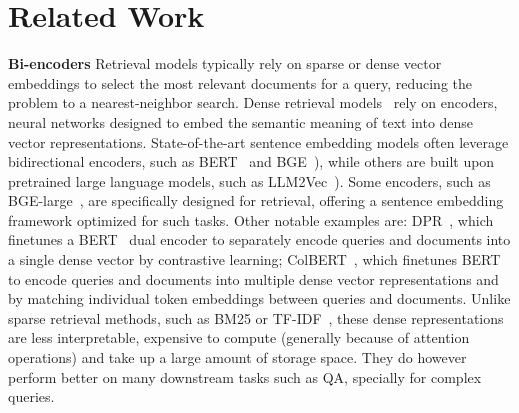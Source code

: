 \section{Related Work}
\noindent\textbf{Bi-encoders}
Retrieval models typically rely on sparse or dense vector embeddings to select the most relevant documents for a query, reducing the problem to a nearest-neighbor search.
Dense retrieval models~\cite{karpukhin-2020-dpr, khattab2020colbert} rely on encoders, neural networks designed to embed the semantic meaning of text into dense vector representations.
State-of-the-art sentence embedding models often leverage bidirectional encoders, such as BERT~\cite{devlin2019-bert} and BGE~\cite{xiao-bge}), 
while others are built upon pretrained large language models, such as LLM2Vec~\cite{behnamghader2024llmvec}). 
Some encoders, such as BGE-large~\cite{xiao-bge},
are specifically designed for retrieval, offering a %
sentence embedding framework optimized for such tasks.
Other notable examples are: DPR~\cite{karpukhin-2020-dpr}, which finetunes a BERT~\cite{devlin2019-bert} dual encoder to separately encode queries and documents into a single dense vector by contrastive learning;
ColBERT~\cite{khattab2020colbert, santhanam2021colbertv2}, which finetunes BERT to encode queries and documents into multiple dense vector representations and by matching individual token embeddings between queries and documents.
Unlike sparse retrieval methods, such as BM25 or TF-IDF~\cite{salton-tfidf}, these dense representations 
are less interpretable, expensive to compute (generally because of attention operations) and take up a large amount of storage space. They do however perform better on many downstream tasks such as QA, specially for complex queries. 

